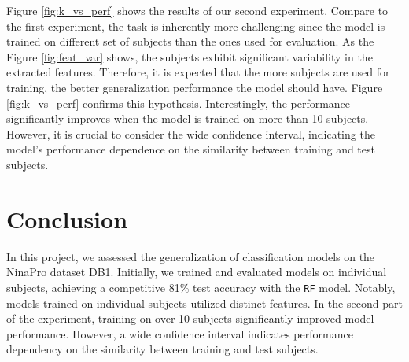 \documentclass[10pt]{article}
\begin{document}
Figure \ref{fig:k_vs_perf} shows the results of our second experiment. Compare to the first experiment,
the task is inherently more challenging since the model is trained on different set of subjects than the ones used for evaluation.
As the Figure \ref{fig:feat_var} shows, the subjects exhibit significant variability in the extracted features. Therefore,
it is expected that the more subjects are used for training, the better generalization performance the model should have.
Figure \ref{fig:k_vs_perf} confirms this hypothesis. Interestingly, the performance significantly improves when the model is trained on more than 10 subjects. 
However, it is crucial to consider the wide confidence interval, indicating the model's performance 
dependence on the similarity between training and test subjects.

\section{Conclusion}
In this project, we assessed the generalization of classification models on the NinaPro dataset DB1. 
Initially, we trained and evaluated models on individual subjects, achieving a competitive 81\% test accuracy with the \texttt{RF} model. 
Notably, models trained on individual subjects utilized distinct features. 
In the second part of the experiment, training on over 10 subjects significantly improved model performance. 
However, a wide confidence interval indicates performance dependency on the similarity between training and test subjects. 

\newpage


\end{document}
